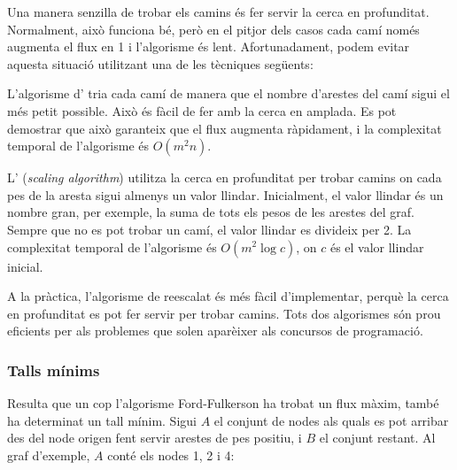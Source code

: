 Una manera senzilla de trobar els camins és fer servir la cerca en
profunditat. Normalment, això funciona bé, però en el pitjor dels
casos cada camí només augmenta el flux en 1 i l'algorisme és
lent. Afortunadament, podem evitar aquesta situació utilitzant una de
les tècniques següents:


L'algorisme d' \cite{edm72} tria cada camí de manera
que el nombre d'arestes del camí sigui el més petit possible. Això és
fàcil de fer amb la cerca en amplada. Es pot demostrar que això
garanteix que el flux augmenta ràpidament, i la complexitat temporal
de l'algorisme és $O(m^2 n)$.


L' (\emph{scaling algorithm}) \cite{ahu91}
utilitza la cerca en profunditat per trobar camins on cada pes de la
aresta sigui almenys un valor llindar. Inicialment, el valor llindar
és un nombre gran, per exemple, la suma de tots els pesos de les
arestes del graf. Sempre que no es pot trobar un camí, el valor
llindar es divideix per 2. La complexitat temporal de l'algorisme és
$O(m^2 \log c)$, on $c$ és el valor llindar inicial.

A la pràctica, l'algorisme de reescalat és més fàcil d'implementar,
perquè la cerca en profunditat es pot fer servir per trobar
camins. Tots dos algorismes són prou eficients per als problemes que
solen aparèixer als concursos de programació.

\subsubsection{Talls mínims}


Resulta que un cop l'algorisme Ford-Fulkerson ha trobat un flux màxim,
també ha determinat un tall mínim. Sigui $A$ el conjunt de nodes als
quals es pot arribar des del node origen fent servir arestes de pes
positiu, i $B$ el conjunt restant. Al graf d'exemple, $A$ conté els
nodes 1, 2 i 4:


